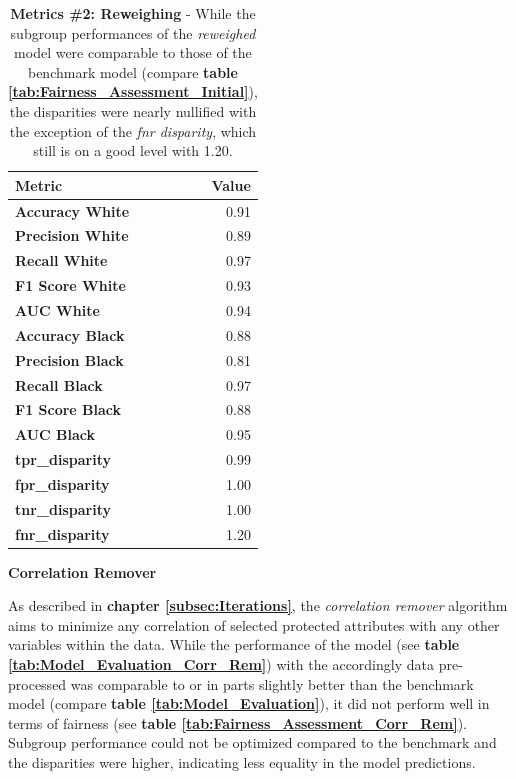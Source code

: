 \begin{table}[h]%
    \centering
    \begin{tabular}{lr}
    \toprule
    \textbf{Metric} & \textbf{Value} \\
    \midrule
    \textbf{Accuracy White} & 0.91 \\
    \textbf{Precision White} & 0.89 \\
    \textbf{Recall White} & 0.97 \\
    \textbf{F1 Score White} & 0.93 \\
    \textbf{AUC White} & 0.94 \\
    \midrule
    \textbf{Accuracy Black} & 0.88 \\
    \textbf{Precision Black} & 0.81 \\
    \textbf{Recall Black} & 0.97 \\
    \textbf{F1 Score Black} & 0.88 \\
    \textbf{AUC Black} & 0.95 \\
    \midrule
    \textbf{tpr\_disparity} & 0.99 \\
    \textbf{fpr\_disparity} & 1.00 \\
    \textbf{tnr\_disparity} & 1.00 \\
    \textbf{fnr\_disparity} & 1.20 \\
    \bottomrule
    \end{tabular}
    \medskip
    \caption[Metrics \#2: Reweighing]{\textbf{Metrics \#2: Reweighing} - While the subgroup performances of the \textit{reweighed} model were comparable to those of the benchmark model (compare \textbf{table \ref{tab:Fairness_Assessment_Initial}}), the disparities were nearly nullified with the exception of the \textit{fnr disparity}, which still is on a good level with 1.20.}
    \label{tab:Fairness_Assessment_Reweighing}
\end{table}

\textbf{Correlation Remover}

As described in \textbf{chapter \ref{subsec:Iterations}}, the \textit{correlation remover} algorithm aims to minimize any correlation of selected protected attributes with any other variables within the data.
While the performance of the model (see \textbf{table \ref{tab:Model_Evaluation_Corr_Rem}}) with the accordingly data pre-processed was comparable to or in parts slightly better than the benchmark model (compare \textbf{table \ref{tab:Model_Evaluation}}), it did not perform well in terms of fairness (see \textbf{table \ref{tab:Fairness_Assessment_Corr_Rem}}).
Subgroup performance could not be optimized compared to the benchmark and the disparities were higher, indicating less equality in the model predictions.

